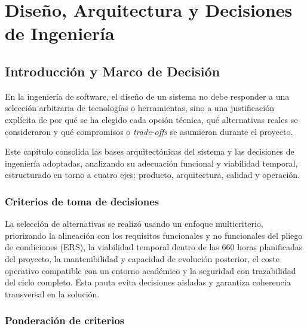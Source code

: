 \chapter{Dise\~no, Arquitectura y Decisiones de Ingenier\'ia}\label{cap_diseno}
\makeatletter
{}
\makeatother

\FloatBarrier
\section{Introducci\'on y Marco de Decisi\'on}

En la ingenier\'ia de software, el dise\~no de un sistema no debe responder a una selecci\'on arbitraria de tecnolog\'ias o herramientas, sino a una justificaci\'on expl\'icita de por qu\'e se ha elegido cada opci\'on t\'ecnica, qu\'e alternativas reales se consideraron y qu\'e compromisos o \emph{trade-offs} se asumieron durante el proyecto.

Este cap\'itulo consolida las bases arquitect\'onicas del sistema y las decisiones de ingenier\'ia adoptadas, analizando su adecuaci\'on funcional y viabilidad temporal, estructurado en torno a cuatro ejes: producto, arquitectura, calidad y operaci\'on.

\subsection{Criterios de toma de decisiones}

La selecci\'on de alternativas se realiz\'o usando un enfoque multicriterio, priorizando la alineaci\'on con los requisitos funcionales y no funcionales del pliego de condiciones (ERS), la viabilidad temporal dentro de las 660 horas planificadas del proyecto, la mantenibilidad y capacidad de evoluci\'on posterior, el coste operativo compatible con un entorno acad\'emico y la seguridad con trazabilidad del ciclo completo. Esta pauta evita decisiones aisladas y garantiza coherencia transversal en la soluci\'on.

\subsection{Ponderaci\'on de criterios}

